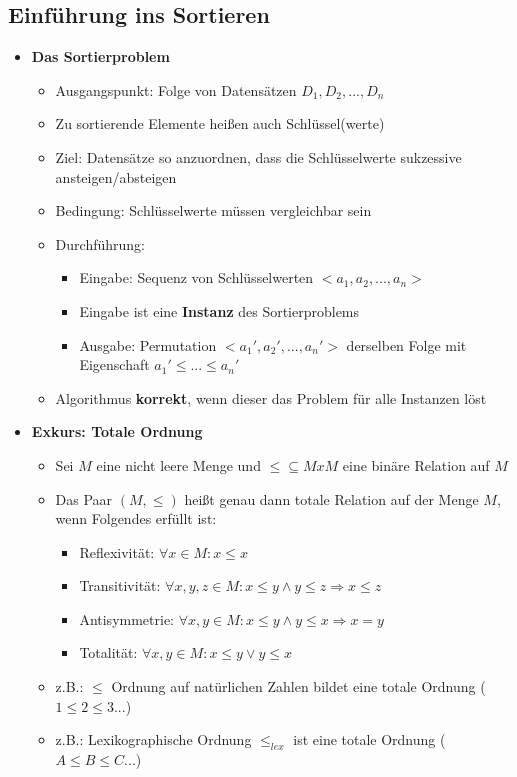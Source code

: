 \subsection{Einführung ins Sortieren}
    \begin{itemize}
        \item \textbf{Das Sortierproblem}
            \begin{itemize}
                \item Ausgangspunkt: Folge von Datensätzen $D_1,D_2,...,D_n$
                \item Zu sortierende Elemente hei\ss en auch Schlüssel(werte)
                \item Ziel: Datensätze so anzuordnen, dass die Schlüsselwerte sukzessive ansteigen/absteigen
                \item Bedingung: Schlüsselwerte müssen vergleichbar sein
                \item Durchführung:
                    \begin{itemize}
                        \item Eingabe: Sequenz von Schlüsselwerten $<a_1,a_2,...,a_n>$
                        \item Eingabe ist eine \textbf{Instanz} des Sortierproblems
                        \item Ausgabe: Permutation $<a_1', a_2', ..., a_n'>$ derselben Folge mit Eigenschaft $a_1' \leq ... \leq a_n'$
                    \end{itemize}
                \item Algorithmus \textbf{korrekt}, wenn dieser das Problem für alle Instanzen löst
            \end{itemize}

        \item \textbf{Exkurs: Totale Ordnung}
            \begin{itemize}
                \item Sei $M$ eine nicht leere Menge und $\leq \subseteq MxM$ eine binäre Relation auf $M$
                \item Das Paar $(M, \leq)$ hei\ss t genau dann totale Relation auf der Menge $M$, wenn Folgendes erfüllt ist:
                    \begin{itemize}
                        \item Reflexivität: $\forall x \in M: x \leq x$
                        \item Transitivität: $\forall x,y,z \in M: x \leq y \land y \leq z \Rightarrow x \leq z$
                        \item Antisymmetrie: $\forall x,y \in M: x \leq y \land y \leq x \Rightarrow x = y$
                        \item Totalität: $\forall x,y \in M: x \leq y \lor y \leq x$
                    \end{itemize}
                \item z.B.: $\leq$ Ordnung auf natürlichen Zahlen bildet eine totale Ordnung ($1 \leq 2 \leq 3 ...$)
                \item z.B.: Lexikographische Ordnung $\leq_{lex}$ ist eine totale Ordnung ($A \leq B \leq C ...$)
            \end{itemize}
        

\end{itemize}

